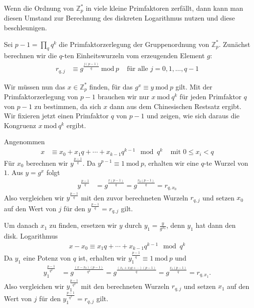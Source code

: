 \documentclass[
  a4paper,
  11pt,
]{scrartcl}
\theoremstyle{plain}
\theoremstyle{definition}
\theoremstyle{remark}
\newcommand{\Z}{\mathbb{Z}}
\newcommand{\Mod}[1]{\ \mathrm{mod}\ #1}
\begin{document}
Wenn die Ordnung von $\Z_p^*$ in viele kleine Primfaktoren zerfällt, dann kann
man diesen Umstand zur Berechnung des diskreten Logarithmus nutzen und diese
beschleunigen.

Sei $p-1 = \prod\limits_q q^k$ die Primfaktorzerlegung der Gruppenordnung von
$\Z_p^*$. Zunächst berechnen wir die $q$-ten Einheitswurzeln vom erzeugenden
Element $g$:
\begin{align*}
  r_{q, j} &
    \equiv g^{\frac{j(p-1)}{q}} \Mod{p} &
    \text{ für alle } j = 0, 1, \ldots, q-1
\end{align*}

Wir müssen nun das $x \in \Z_p^*$ finden, für das $g^x \equiv y \Mod{p}$ gilt.
Mit der Primfaktorzerlegung von $p-1$ brauchen wir nur $x \Mod{q^k}$ für jeden
Primfaktor $q$ von $p-1$ zu bestimmen, da sich $x$ dann aus dem Chinesischen
Restsatz ergibt. Wir fixieren jetzt einen Primfaktor $q$ von $p-1$ und zeigen,
wie sich daraus die Kongruenz $x \Mod{q^k}$ ergibt.

Angenommen
\begin{align*}
  x & \equiv x_0 + x_1 q + \cdots + x_{k-1} q^{k-1} \mod q^k
    & \text{ mit } 0 \leq x_i < q
\end{align*}
Für $x_0$ berechnen wir $y^{\frac{p-1}{q}}$. Da $y^{p-1} \equiv 1 \Mod{p}$,
erhalten wir eine $q$-te Wurzel von $1$. Aus $y = g^x$ folgt
\begin{align*}
  y^{\frac{p-1}{q}} &
    = g^{\frac{x(p-1)}{q}}
    = g^{\frac{x_0 (p-1)}{q}}
    = r_{q, x_0}
\end{align*}
Also vergleichen wir $y^{\frac{p-1}{q}}$ mit den zuvor berechneten Wurzeln
$r_{q, j}$ und setzen $x_0$ auf den Wert von $j$ für den
$y^{\frac{p-1}{q}} = r_{q, j}$ gilt.

Um danach $x_1$ zu finden, ersetzen wir $y$ durch $y_1 = \frac{y}{g^{x_0}}$,
denn $y_1$ hat dann den disk. Logarithmus
\begin{align*}
  x - x_0 \equiv x_1 q + \cdots + x_{k-1} q^{k-1} \mod q^k
\end{align*}
Da $y_1$ eine Potenz von $q$ ist, erhalten wir
$y_1^{\frac{p-1}{q}} \equiv 1 \Mod{p}$ und
\begin{align*}
  y_1^{\frac{p-1}{q^2}} &
    = g^{\frac{(x-x_0) (p-1)}{q^2}}
    = g^{\frac{(x_1 + x_2 q + \cdots) (p-1)}{q}}
    = g^{\frac{x_1 (p-1)}{q}}
    = r_{q, x_1}.
\end{align*}
Also vergleichen wir $y_1^{\frac{p-1}{q^2}}$ mit den berechneten Wurzeln
$r_{q, j}$ und setzen $x_1$ auf den Wert von $j$ für den
$y_1^{\frac{p-1}{q^2}} = r_{q, j}$ gilt.
\end{document}
